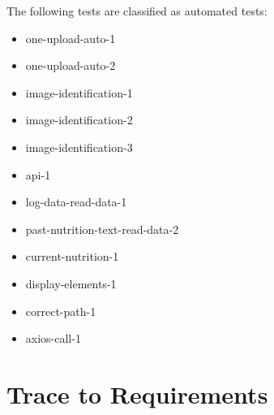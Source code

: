 \documentclass[12pt, titlepage]{article}
\begin{document}
	The following tests are classified as automated tests:
    \begin{itemize}
        \item one-upload-auto-1
        \item one-upload-auto-2
        \item image-identification-1
        \item image-identification-2
        \item image-identification-3
        \item api-1
        \item log-data-read-data-1
        \item past-nutrition-text-read-data-2
        \item current-nutrition-1
        \item display-elements-1
        \item correct-path-1
        \item axios-call-1
    \end{itemize}
	
	\section{Trace to Requirements}
	
\end{document}
